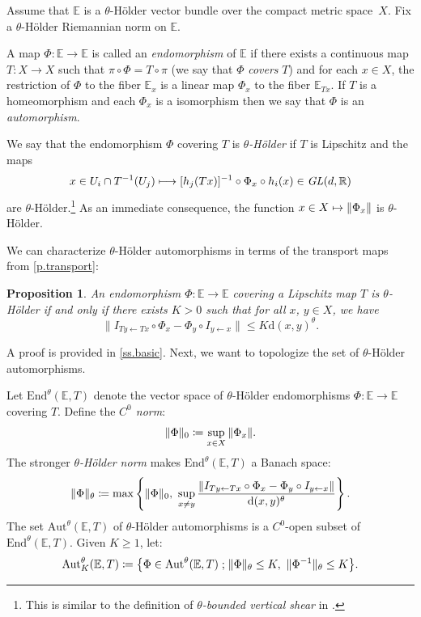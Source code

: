 \documentclass[JEP,XML,SOM,Unicode]{cedram}
\def\vcentcolon{\mathrel{\mathop\ordinarycolon}}
\providecommand\ordinarycolon{:}
\providecommand*\coloneqq{\vcentcolon\mathrel{\mkern-1.2mu}=}
\newcommand\mto{\mathchoice{\longmapsto}{\mapsto}{\mapsto}{\mapsto}}
\theoremstyle{plain}
\newtheorem{proposition}[theorem]{Proposition}
\theoremstyle{definition}
\newcommand{\RR}{\mathbb{R}}
\newcommand{\EE}{\mathbb{E}}
\newcommand{\st}{\;\mathord{;}\;}
\newcommand{\GL}{\mathit{GL}}
\newcommand{\dd}{\mathrm{d}}
\newcommand{\Aut}{\mathrm{Aut}}
\newcommand{\End}{\mathrm{End}}
\begin{document}
Assume that $\EE$ is a $\theta$-Hölder vector bundle over the compact metric space~$X$.
Fix a $\theta$-Hölder Riemannian norm on $\EE$.

A map $\Phi \colon \EE \to \EE$ is called an \emph{endomorphism} of $\EE$ if
there exists a continuous map $T \colon X \to X$ such that $\pi \circ \Phi = T \circ \pi$
(we say that $\Phi$ \emph{covers} $T$) and for each $x \in X$, the restriction of $\Phi$ to the fiber $\EE_x$ is a linear map $\Phi_x$ to the fiber $\EE_{Tx}$. If $T$ is a homeomorphism and each $\Phi_x$ is a isomorphism then we say that $\Phi$ is an \emph{automorphism}.

We say that the endomorphism $\Phi$ covering $T$ is \emph{$\theta$-Hölder} if $T$ is Lipschitz and the maps
\[
x \in U_i \cap T^{-1}(U_j) \mto [h_j(Tx)]^{-1} \circ \Phi_x \circ h_i(x) \in \GL(d,\RR)
\]
are $\theta$-Hölder.\footnote{This is similar to the definition of \emph{$\theta$-bounded vertical shear} in \cite{PSW2}.}
As an immediate consequence, the function $x \in X \mto \|\Phi_x\|$ is $\theta$\nobreakdash-Hölder.

We can characterize $\theta$-Hölder automorphisms in terms of the transport maps from \cref{p.transport}:
\begin{proposition}\label{p.endo_Holder}
An endomorphism $\Phi \colon \EE \to \EE$ covering a Lipschitz map $T$ is $\theta$-Hölder if and only if there exists $K>0$ such that for all
$x$, $y \in X$, we have
\[
\big\| I_{Ty \gets Tx} \circ \Phi_x - \Phi_y \circ I_{y \gets x} \big\| \le K \dd(x,y)^\theta.
\]
\end{proposition}

A proof is provided in \cref{ss.basic}. Next, we want to topologize the set of $\theta$\nobreakdash-Hölder automorphisms.

Let $\End^\theta(\EE,T)$ denote the vector space of $\theta$-Hölder endomorphisms $\Phi \colon \EE \to \EE$ covering $T$.
Define the \emph{$C^0$ norm}:
\begin{equation}\label{e.C0_norm}
\|\Phi\|_0 \coloneqq \sup_{x \in X} \|\Phi_x\|.
\end{equation}
The stronger \emph{$\theta$-Hölder norm} makes $\End^\theta(\EE,T)$ a Banach space:
\begin{equation}\label{e.Holder_norm}
\|\Phi\|_\theta \coloneqq \max \left\{ \|\Phi\|_0, \ \sup_{x \neq y} \frac{\|I_{Ty \gets Tx} \circ \Phi_x - \Phi_y \circ I_{y \gets x}\|}{\dd(x,y)^\theta} \right\}.
\end{equation}
The set $\Aut^\theta(\EE,T)$ of $\theta$-Hölder automorphisms is a $C^0$-open subset of $\End^\theta(\EE,T)$.
Given $K\ge 1$, let:
\begin{equation}\label{e.bounded_set}
\Aut^\theta_K(\EE,T) \coloneqq \big\{ \Phi \in \Aut^\theta(\EE,T) \st \|\Phi\|_\theta \le K, \ \|\Phi^{-1}\|_\theta \le K \big\}.
\end{equation}
\end{document}
